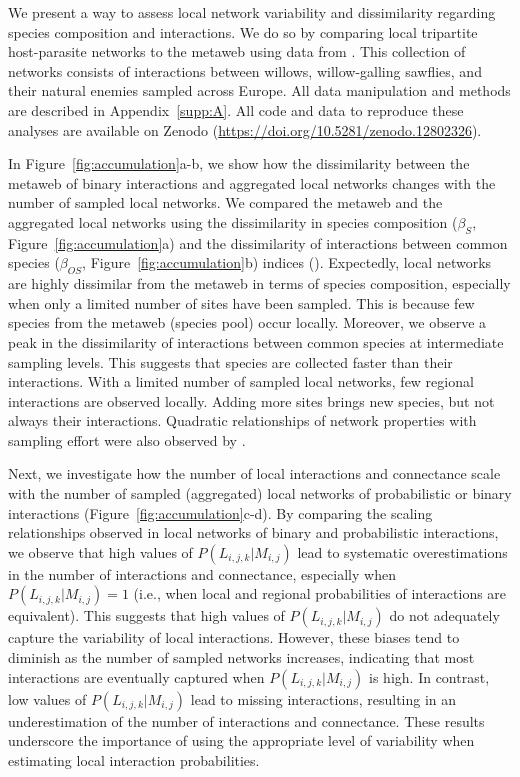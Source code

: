 \begin{box2.2}

We present a way to assess local network variability and dissimilarity regarding
species composition and interactions. We do so by comparing local tripartite
host-parasite networks to the metaweb using data from
\textcite{Kopelke2017Foodweb}. This collection of networks consists of
interactions between willows, willow-galling sawflies, and their natural enemies
sampled across Europe. All data manipulation and methods are described in
Appendix~\ref{supp:A}. All code and data to reproduce these analyses are
available on Zenodo (\url{https://doi.org/10.5281/zenodo.12802326}).

In Figure~\ref{fig:accumulation}a-b, we show how the dissimilarity between the
metaweb of binary interactions and aggregated local networks changes with the
number of sampled local networks. We compared the metaweb and the aggregated
local networks using the dissimilarity in species composition ($\beta_{S}$,
Figure~\ref{fig:accumulation}a) and the dissimilarity of interactions between
common species ($\beta_{OS}$, Figure~\ref{fig:accumulation}b) indices
(\cite{Poisot2012Dissimilarity}). Expectedly, local networks are highly
dissimilar from the metaweb in terms of species composition, especially when
only a limited number of sites have been sampled. This is because few species
from the metaweb (species pool) occur locally. Moreover, we observe a peak in
the dissimilarity of interactions between common species at intermediate
sampling levels. This suggests that species are collected faster than their
interactions. With a limited number of sampled local networks, few regional
interactions are observed locally. Adding more sites brings new species, but not
always their interactions. Quadratic relationships of network properties with
sampling effort were also observed by \textcite{McLeod2021Sampling}.

Next, we investigate how the number of local interactions and connectance
scale with the number of sampled (aggregated) local networks of probabilistic
or binary interactions (Figure~\ref{fig:accumulation}c-d). By comparing the scaling
relationships observed in local networks of binary and probabilistic
interactions, we observe that high values of $P(L_{i, j, k}|M_{i, j})$ lead to
systematic overestimations in the number of interactions and connectance,
especially when $P(L_{i, j, k}|M_{i, j}) = 1$ (i.e., when local and regional
probabilities of interactions are equivalent). This suggests that high values
of $P(L_{i, j, k}|M_{i, j})$ do not adequately capture the variability of
local interactions. However, these biases tend to diminish as the number of
sampled networks increases, indicating that most interactions are eventually
captured when $P(L_{i, j, k}|M_{i, j})$ is high. In contrast, low values of
$P(L_{i, j, k}|M_{i, j})$ lead to missing interactions, resulting in an
underestimation of the number of interactions and connectance. These results
underscore the importance of using the appropriate level of variability when
estimating local interaction probabilities.


\end{box2.2}
